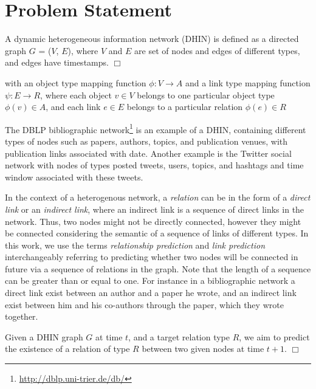 \section{Problem Statement}

\begin{definition}
A dynamic heterogeneous information network (DHIN) is defined as a directed graph $G$ = ($V$, $E$), where $V$ and $E$ are set of nodes and edges of different types, and edges have timestamps. $\Box$ 


with an object type mapping function $\phi: V \rightarrow A$ and a link type mapping function $\psi: E \rightarrow R$, where each object $v \in V$ belongs to one particular object type $\phi(v) \in A$, and each link $e \in E$ belongs to a particular relation $\phi(e) \in R$

\end{definition}

The DBLP bibliographic network\footnote{\url{http://dblp.uni-trier.de/db/}} is an example of a DHIN, containing different types of nodes such as papers, authors, topics, and publication venues, with publication links associated with date. Another example is the Twitter social network with nodes of types posted tweets, users, topics, and hashtags and time window associated with these tweets. %

In the context of a heterogenous network, a \textit{relation} can be in the form of a \textit{direct link} or an \textit{indirect link}, where an indirect link is a sequence of direct links in the network. Thus, two nodes might not be directly connected, however they might be connected considering the semantic of a sequence of links of different types. In this work, we use the terms \textit{relationship prediction} and \textit{link prediction} interchangeably referring to predicting whether two nodes will be connected in future via a sequence of relations in the graph. Note that the length of a sequence can be greater than or equal to one. For instance in a bibliographic network a direct link exist between an author and a paper he wrote, and an indirect link exist between him and his co-authors through the paper, which they wrote together.

\begin{definition}\label{problemdef}
Given a DHIN graph $G$ at time $t$, and a target relation type $R$, we aim to predict the existence of a relation of type $R$ between two given nodes at time $t+1$. $\Box$
 \end{definition}

